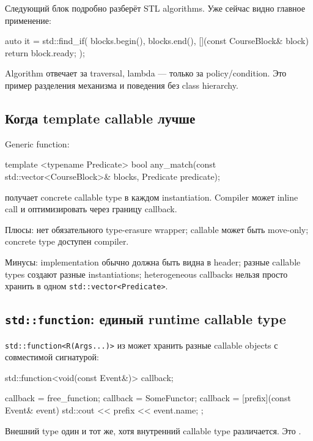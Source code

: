Следующий блок подробно разберёт STL algorithms. Уже сейчас видно главное
применение:

\begin{cppcode}
auto it = std::find_if(
    blocks.begin(),
    blocks.end(),
    [](const CourseBlock& block) {
        return block.ready;
    }
);
\end{cppcode}

Algorithm отвечает за traversal, lambda --- только за policy/condition.
Это пример разделения механизма и поведения без class hierarchy.

\subsection{Когда template callable лучше}

Generic function:

\begin{cppcode}
template <typename Predicate>
bool any_match(const std::vector<CourseBlock>& blocks,
               Predicate predicate);
\end{cppcode}

получает concrete callable type в каждом instantiation. Compiler может inline
call и оптимизировать через границу callback.

Плюсы:
нет обязательного type-erasure wrapper; callable может быть move-only; concrete type доступен compiler.

Минусы:
implementation обычно должна быть видна в header; разные callable types создают разные instantiations; heterogeneous callbacks нельзя просто хранить в одном \texttt{std::vector<Predicate>}.

\subsection{\texttt{std::function}: единый runtime callable type}

\texttt{std::function<R(Args...)>} из  может хранить
разные callable objects с совместимой сигнатурой:

\begin{cppcode}
std::function<void(const Event&)> callback;

callback = free_function;
callback = SomeFunctor{};
callback = [prefix](const Event& event) {
    std::cout << prefix << event.name;
};
\end{cppcode}

Внешний type один и тот же, хотя внутренний callable type различается. Это
.

